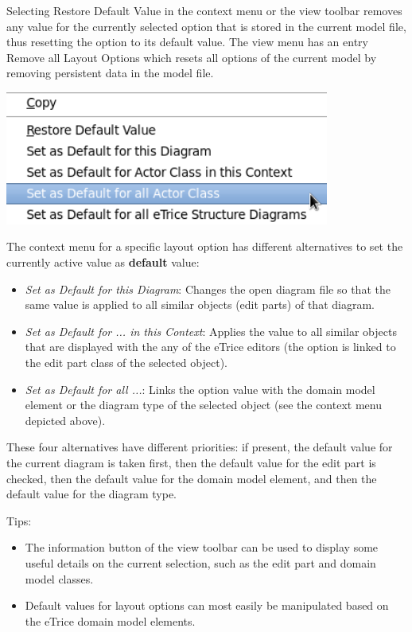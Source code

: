 Selecting Restore Default Value in the context menu or the view toolbar removes any value for the currently selected option that is stored in the current model file, thus resetting the option to its default value. The view menu has an entry Remove all Layout Options which resets all options of the current model by removing persistent data in the model file.

\includegraphics[width=0.8\textwidth]{images/043-ContextMenu.png}

The context menu for a specific layout option has different alternatives to set the currently active value as \textbf{default} value:
\begin{itemize}
\item \textit{Set as Default for this Diagram}: Changes the open diagram file so that the same value is applied to all similar objects (edit parts) of that diagram.

\item \textit{Set as Default for ... in this Context}: Applies the value to all similar objects that are displayed with the any of the eTrice editors (the option is linked to the edit part class of the selected object).

\item \textit{Set as Default for all ...}: Links the option value with the domain model element or the diagram type of the selected object (see the context menu depicted above).
\end{itemize}

These four alternatives have different priorities: if present, the default value for the current diagram is taken first, then the default value for the edit part is checked, then the default value for the domain model element, and then the default value for the diagram type.

Tips:
\begin{itemize}
\item The information button of the view toolbar can be used to display some useful details on the current selection, such as the edit part and domain model classes.
\item Default values for layout options can most easily be manipulated based on the eTrice domain model elements.
\end{itemize}

